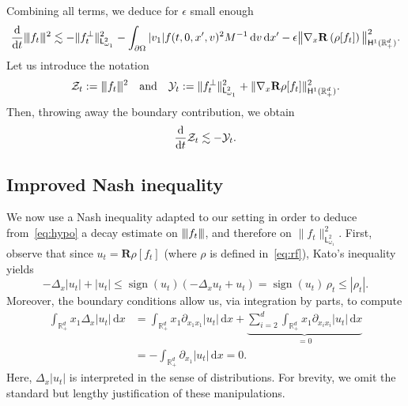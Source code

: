 \documentclass[11pt]{amsart}
\theoremstyle{definition}
\theoremstyle{remark}
\numberwithin{equation}{section}
\newcommand{\Nt}{|\hskip-0.04cm|\hskip-0.04cm|}
\newcommand\R{{\mathbb R}}
\def\YY{{\mathcal Y}}
\def\ZZ{{\mathcal Z}}
\newcommand{\dd}{{\, \mathrm d}}
\newcommand{\dt}{\frac{{\rm d}}{{\rm d}t}}
\newcommand{\sfL}{\mathsf{L}}
\newcommand{\sfH}{\mathsf{H}}
\begin{document}
Combining all terms, we deduce for $\epsilon$ small enough
\begin{equation*}
  \dt  \Nt f_t \Nt^2
  \lesssim - \| f_t ^\bot \|_{\sfL^2_{\omega_1}}^2  - \int_{\partial  \Omega} |v_1| f(t,0,x',v)^2 M^{-1} \dd v \dd x'
  - \epsilon \big\| \nabla_x \mathbf R \left( \rho[f_t] \right) \big\|_{\sfH^1(\R_+^d)}^2.
\end{equation*}
Let us introduce the notation
\begin{equation}
  \label{eq:notationsZY}
  \ZZ_t := \Nt f_t \Nt ^2 \quad \mbox{and} \quad \YY_t := \| f_t^\bot \|_{\sfL^2_{\omega_1}}^2 +  \| \nabla_x \mathbf R \rho[f_t] \|_{\sfH^1(\R_+^d)}^2.
\end{equation}
Then, throwing away the boundary contribution, we obtain
\begin{align}
  \label{eq:hypo}
  \dt  \ZZ_t  \lesssim - \YY_t.
\end{align}

\subsection{Improved Nash inequality}

We now use a Nash inequality adapted to our setting in order to deduce from~\eqref{eq:hypo} a decay estimate on $\Nt f_t \Nt$, and therefore on $\| f_t \|_{\sfL^2_{\omega_1}}^2$. First, observe that since $u_t = \mathbf{R} \rho[f_t]$ (where $\rho$ is defined in~\eqref{eq:rf}), Kato's inequality yields
\begin{equation*}
  -\Delta_x |u_t| + |u_t| \leq \operatorname{sign}(u_t)\left(-\Delta_x u_t + u_t\right) = \operatorname{sign}(u_t)\, \rho_t \leq |\rho_t|.
\end{equation*}
Moreover, the boundary conditions allow us, via integration by parts, to compute
\begin{align*}
  \int_{\mathbb{R}^d_+} x_1 \Delta_x |u_t|\, \mathrm{d}x
  &= \int_{\mathbb{R}^d_+} x_1 \partial_{x_1x_1} |u_t|\, \mathrm{d}x 
     + \underbrace{\sum_{i=2}^d \int_{\mathbb{R}^d_+} x_1 \partial_{x_i x_i} |u_t|\, \mathrm{d}x}_{=0} \\
  &= -\int_{\mathbb{R}^d_+} \partial_{x_1} |u_t|\, \mathrm{d}x = 0.
\end{align*}
Here, $\Delta_x |u_t|$ is interpreted in the sense of distributions. For brevity, we omit the standard but lengthy justification of these manipulations.
\end{document}
